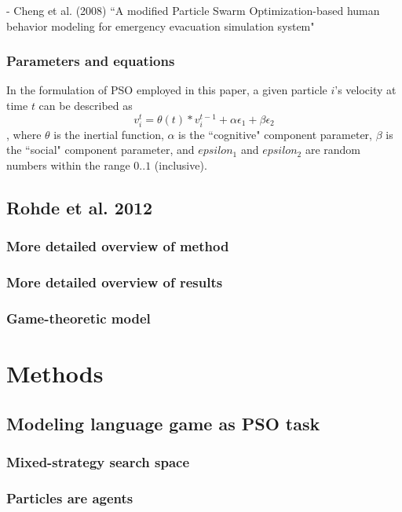 \documentclass[12pt]{article}
\begin{document}
- Cheng et al. (2008) ``A modified Particle Swarm Optimization-based human behavior modeling for emergency evacuation simulation system"

\subsubsection{Parameters and equations}
In the formulation of PSO employed in this paper, a given particle $i$'s velocity at time $t$ can be described as
\[
v_i^t = \theta(t) * v_i^{t-1} + \alpha \epsilon_1 + \beta \epsilon_2
\],
where $\theta$ is the inertial function, $\alpha$ is the ``cognitive" component parameter, $\beta$ is the ``social" component parameter, and $epsilon_1$ and $epsilon_2$ are random numbers within the range $0..1$ (inclusive).

\subsection{Rohde et al. 2012}
\subsubsection{More detailed overview of method}
\subsubsection{More detailed overview of results}
\subsubsection{Game-theoretic model}


\section{Methods}
\subsection{Modeling language game as PSO task}
\subsubsection{Mixed-strategy search space}
\subsubsection{Particles are agents}
\end{document}
